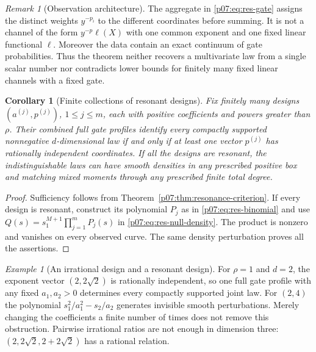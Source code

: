 \documentclass[11pt,letterpaper]{article}
\newtheorem{corollary}[theorem]{Corollary}
\theoremstyle{definition}
\theoremstyle{remark}
\newtheorem{remark}[theorem]{Remark}
\newtheorem{example}[theorem]{Example}
\newcommand{\1}{\mathbf 1}
\begin{document}
\begin{remark}[Observation architecture]\label{p07:rem:res-architecture}
The aggregate in \eqref{p07:eq:res-gate} assigns the distinct weights
$y^{-p_i}$ to the different coordinates before summing.  It is not a
channel of the form $y^{-p}\ell(X)$ with one common exponent and one
fixed linear functional $\ell$.  Moreover the data contain an exact
continuum of gate probabilities.  Thus the theorem neither recovers a
multivariate law from a single scalar number nor contradicts lower
bounds for finitely many fixed linear channels with a fixed gate.
\end{remark}

\begin{corollary}[Finite collections of resonant designs]
\label{p07:cor:res-finite-designs}
Fix finitely many designs $(a^{(j)},p^{(j)})$, $1\leq j\leq m$, each
with positive coefficients and powers greater than $\rho$.
Their combined full gate profiles identify every compactly supported
nonnegative $d$-dimensional law if and only if at least one vector
$p^{(j)}$ has rationally independent coordinates.  If all the designs
are resonant, the indistinguishable laws can have smooth densities
in any prescribed positive box and matching mixed moments through
any prescribed finite total degree.
\end{corollary}

\begin{proof}
Sufficiency follows from Theorem~\ref{p07:thm:resonance-criterion}.
If every design is resonant, construct its polynomial $P_j$ as in
\eqref{p07:eq:res-binomial} and use
$Q(s)=s_1^{M+1}\prod_{j=1}^m P_j(s)$ in
\eqref{p07:eq:res-null-density}.  The product is nonzero and vanishes
on every observed curve.  The same density perturbation proves all
the assertions.
\end{proof}

\begin{example}[An irrational design and a resonant design]
For $\rho=1$ and $d=2$, the exponent vector $(2,2\sqrt2)$ is
rationally independent, so one full gate profile with any fixed
$a_1,a_2>0$ determines every compactly supported joint law.
For $(2,4)$ the polynomial
$s_1^2/a_1^2-s_2/a_2$ generates invisible smooth perturbations.
Merely changing the coefficients a finite number of times does not
remove this obstruction.  Pairwise irrational ratios are not enough
in dimension three: $(2,2\sqrt2,2+2\sqrt2)$ has a rational relation.
\end{example}
\end{document}
